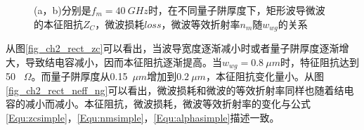 \begin{figure}[htb]
	\small
\caption{(a，b)分别是$f_m = 40~GHz$时，在不同量子阱厚度下，矩形波导微波的本征阻抗$Z_C$，微波损耗$loss$，微波等效折射率$n_m$随$w_{wg}$的关系}
\label{fig_ch2_rect_microwave_property}	
\end{figure}

从图\ref{fig_ch2_rect_zc}可以看出，当波导宽度逐渐减小时或者量子阱厚度逐渐增大，导致结电容减小，因而本征阻抗逐渐提高。当$w_{wg} = 0.8~ \mu m$时，特征阻抗达到50~ $\Omega$。而量子阱厚度从0.15~$\mu m$增加到$0.2~\mu m$，本征阻抗变化量小。从图\ref{fig_ch2_rect_neff_ng}可以看出，微波损耗和微波的等效折射率同样也随着结电容的减小而减小。本征阻抗，微波损耗，微波等效折射率的变化与公式\ref{Equ:zcsimple}，\ref{Equ:nmsimple}，\ref{Equ:alphasimple}描述一致。

